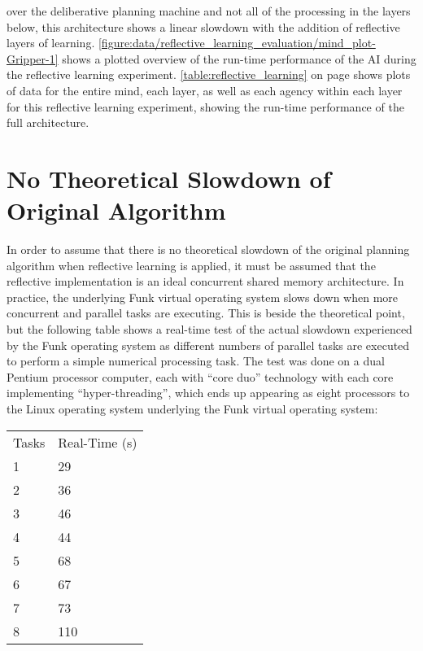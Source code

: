 over the deliberative planning machine and not all of the processing
in the layers below, this architecture shows a linear slowdown with
the addition of reflective layers of learning.
{\mbox{\autoref{figure:data/reflective_learning_evaluation/mind_plot-Gripper-1}}}
shows a plotted overview of the run-time performance of the AI during
the reflective learning experiment.
\autoref{table:reflective_learning} on page
\pageref{table:reflective_learning} shows plots of data for the entire
mind, each layer, as well as each agency within each layer for this
reflective learning experiment, showing the run-time performance of
the full architecture.

\section{No Theoretical Slowdown of Original Algorithm}

In order to assume that there is no theoretical slowdown of the
original planning algorithm when reflective learning is applied, it
must be assumed that the reflective implementation is an ideal
concurrent shared memory architecture.  In practice, the underlying
Funk virtual operating system slows down when more concurrent and
parallel tasks are executing.  This is beside the theoretical point,
but the following table shows a real-time test of the actual slowdown
experienced by the Funk operating system as different numbers of
parallel tasks are executed to perform a simple numerical processing
task.  The test was done on a dual Pentium processor computer, each
with ``core duo'' technology with each core implementing
``hyper-threading'', which ends up appearing as eight processors to
the Linux operating system underlying the Funk virtual operating
system:

\vspace{5mm}
\begin{tabular}{ll}
Tasks & Real-Time (s) \\
1 & 29\\
2 & 36\\
3 & 46\\
4 & 44\\
5 & 68\\
6 & 67\\
7 & 73\\
8 & 110\\
\end{tabular}
\vspace{5mm}

